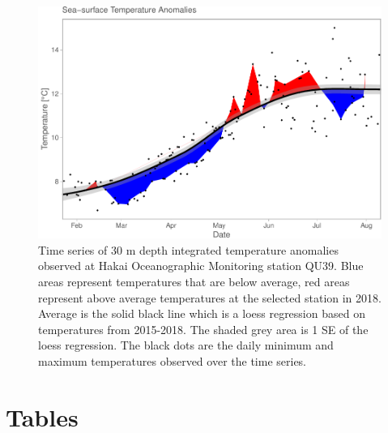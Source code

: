 \documentclass[fleqn,10pt]{wlpeerj} %
\begin{document}
\begin{figure}[H]
\includegraphics[width=0.9\linewidth]{Migration_Observations_Report_files/figure-latex/sst-1} \caption{Time series of 30 m depth integrated temperature anomalies observed at Hakai Oceanographic Monitoring station QU39. Blue areas represent temperatures that are below average, red areas represent above average temperatures at the selected station in 2018. Average is the solid black line which is a loess regression based on temperatures from 2015-2018. The shaded grey area is 1 SE of the loess regression. The black dots are the daily minimum and maximum temperatures observed over the time series.}\label{fig:sst}
\end{figure}

\section{Tables}\label{tables}
\end{document}
